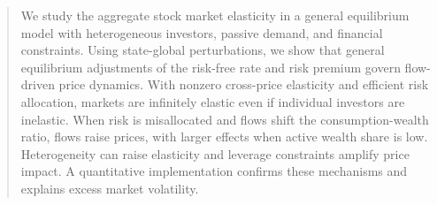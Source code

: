 \documentclass[12pt,english]{article}
\begin{document}
\begin{abstract}
  We study the aggregate stock market elasticity in a general equilibrium model with heterogeneous investors, passive demand, and financial constraints. Using state-global perturbations, we show that general equilibrium adjustments of the risk-free rate and risk premium govern flow-driven price dynamics. With nonzero cross-price elasticity and efficient risk allocation, markets are infinitely elastic even if individual investors are inelastic. When risk is misallocated and flows shift the consumption-wealth ratio, flows raise prices, with larger effects when active wealth share is low. Heterogeneity can raise elasticity and leverage constraints amplify price impact. A quantitative implementation confirms these mechanisms and explains excess market volatility.


\end{abstract}
\end{document}
